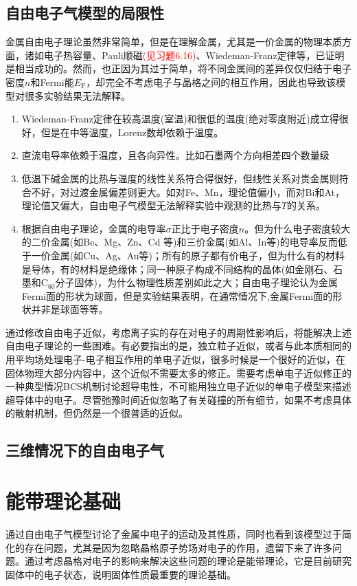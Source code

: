 \subsection{自由电子气模型的局限性}
金属自由电子理论虽然非常简单，但是在理解金属，尤其是一价金属的物理本质方面，诸如电子热容量、Pauli顺磁\textcolor{red}{(见习题6.16)}、Wiedeman-Franz定律等，已证明是相当成功的。然而，也正因为其过于简单，将不同金属间的差异仅仅归结于电子密度$n$和Fermi能$E_{\mathrm{F}}$，却完全不考虑电子与晶格之间的相互作用，因此也导致该模型对很多实验结果无法解释。
\begin{enumerate}
	\item Wiedeman-Franz定律在较高温度(室温)和很低的温度(绝对零度附近)成立得很好，但是在中等温度，Lorenz数却依赖于温度。
	\item 直流电导率依赖于温度，且各向异性。比如石墨两个方向相差四个数量级
	\item 低温下碱金属的比热与温度的线性关系符合得很好，但线性关系对贵金属则符合不好，对过渡金属偏差则更大。如对Fe、Mn，理论值偏小，而对Bi和At，理论值又偏大，自由电子气模型无法解释实验中观测的比热与$T$的关系。

	\item 根据自由电子理论，金属的电导率$\sigma$正比于电子密度$n$。但为什么电子密度较大的二价金属(如Be、Mg、Zn、Cd 等)和三价金属(如Al、In等)的电导率反而低于一价金属(如Cu、Ag、Au等)；所有的原子都有价电子，但为什么有的材料是导体，有的材料是绝缘体；同一种原子构成不同结构的晶体(如金刚石、石墨和$\mathrm{C}_{60}$分子固体)，为什么物理性质差别如此之大；自由电子理论认为金属Fermi面的形状为球面，但是实验结果表明，在通常情况下,金属Fermi面的形状并非是球面等等。
\end{enumerate}

通过修改自由电子近似，考虑离子实的存在对电子的周期性影响后，将能解决上述自由电子理论的一些困难。有必要指出的是，独立粒子近似，或者与此本质相同的用平均场处理电子-电子相互作用的单电子近似，很多时候是一个很好的近似，在固体物理大部分内容中，这个近似不需要太多的修正。需要考虑单电子近似修正的一种典型情况BCS机制讨论超导电性，不可能用独立电子近似的单电子模型来描述超导体中的电子。尽管弛豫时间近似忽略了有关碰撞的所有细节，如果不考虑具体的散射机制，但仍然是一个很普适的近似。

\subsection{三维情况下的自由电子气}

\section{能带理论基础} 
通过自由电子气模型讨论了金属中电子的运动及其性质，同时也看到该模型过于简化的存在问题，尤其是因为忽略晶格原子势场对电子的作用，遗留下来了许多问题。通过考虑晶格对电子的影响来解决这些问题的理论是能带理论，它是目前研究固体中的电子状态，说明固体性质最重要的理论基础。 
